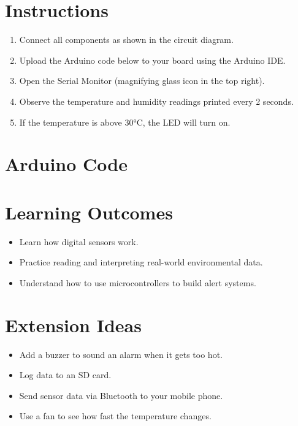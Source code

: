 \documentclass[11pt]{article}
\begin{document}
\section*{Instructions}
\begin{enumerate}
    \item Connect all components as shown in the circuit diagram.
    \item Upload the Arduino code below to your board using the Arduino IDE.
    \item Open the Serial Monitor (magnifying glass icon in the top right).
    \item Observe the temperature and humidity readings printed every 2 seconds.
    \item If the temperature is above 30°C, the LED will turn on.
\end{enumerate}

\section*{Arduino Code}


\section*{Learning Outcomes}
\begin{itemize}
    \item Learn how digital sensors work.
    \item Practice reading and interpreting real-world environmental data.
    \item Understand how to use microcontrollers to build alert systems.
\end{itemize}

\section*{Extension Ideas}
\begin{itemize}
    \item Add a buzzer to sound an alarm when it gets too hot.
    \item Log data to an SD card.
    \item Send sensor data via Bluetooth to your mobile phone.
    \item Use a fan to see how fast the temperature changes.
\end{itemize}
\end{document}
